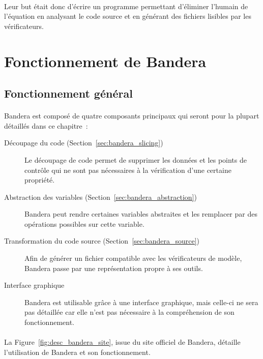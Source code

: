 \paragraph{}
Leur but était donc d'écrire un programme permettant d'éliminer
l'humain de l'équation en analysant le code source et en générant des
fichiers lisibles par les vérificateurs.

\section{Fonctionnement de Bandera}
\subsection{Fonctionnement général}

\paragraph{}
Bandera est composé de quatre composants principaux qui seront pour la
plupart détaillés dans ce chapitre~:

\begin{description}
\item[Découpage du code (Section~\ref{sec:bandera_slicing})] Le découpage de code permet de supprimer les
  données et les points de contrôle qui ne sont pas nécessaires à la
  vérification d'une certaine propriété.
\item[Abstraction des variables (Section~\ref{sec:bandera_abstraction})] Bandera peut rendre certaines
  variables abstraites et les remplacer par des opérations possibles
  sur cette variable.
\item[Transformation du code source (Section~\ref{sec:bandera_source})] Afin de générer un fichier
  compatible avec les vérificateurs de modèle, Bandera passe par une
  représentation propre à ses outils.
\item[Interface graphique] Bandera est utilisable grâce à une
  interface graphique, mais celle-ci ne sera pas détaillée car elle
  n'est pas nécessaire à la compréhension de son fonctionnement.
\end{description}

\paragraph{}
La Figure~\ref{fig:desc_bandera_site}, issue du site officiel de
Bandera, détaille l'utilisation de Bandera et son fonctionnement.

